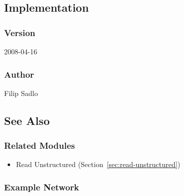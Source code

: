 \subsection{Implementation}


\subsubsection{Version}

2008-04-16


\subsubsection{Author}

Filip Sadlo


\subsection{See Also}


\subsubsection{Related Modules}

\begin{itemize}

\item
  Read Unstructured (Section~\ref{sec:read-unstructured})

\end{itemize}


\subsubsection{Example Network}

